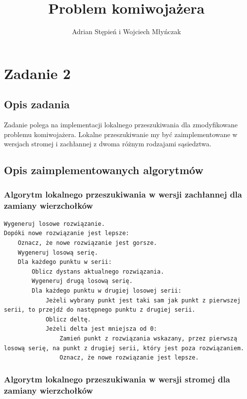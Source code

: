 \documentclass[a4paper]{article}
\title{Problem komiwojażera}
\author{Adrian Stępień i Wojciech Młyńczak}
\begin{document}
\maketitle

\section{Zadanie 2}

\subsection{Opis zadania}

Zadanie polega na implementacji lokalnego przeszukiwania dla zmodyfikowane problemu komiwojażera. Lokalne przeszukiwanie my być zaimplementowane w wersjach stromej i zachłannej z dwoma różnym rodzajami sąsiedztwa.

\subsection{Opis zaimplementowanych algorytmów}

\subsubsection{Algorytm lokalnego przeszukiwania w wersji zachłannej dla zamiany wierzchołków}

\begin{lstlisting}
Wygeneruj losowe rozwiązanie.
Dopóki nowe rozwiązanie jest lepsze:
    Oznacz, że nowe rozwiązanie jest gorsze.
    Wygeneruj losową serię.
    Dla każdego punktu w serii:
        Oblicz dystans aktualnego rozwiązania.
        Wygeneruj drugą losową serię.
        Dla każdego punktu w drugiej losowej serii:
            Jeżeli wybrany punkt jest taki sam jak punkt z pierwszej serii, to przejdź do następnego punktu z drugiej serii.
            Oblicz deltę.
            Jeżeli delta jest mniejsza od 0:
                Zamień punkt z rozwiązania wskazany, przez pierwszą losową serię, na punkt z drugiej serii, który jest poza rozwiązaniem.
                Oznacz, że nowe rozwiązanie jest lepsze.
\end{lstlisting}

\subsubsection{Algorytm lokalnego przeszukiwania w wersji stromej dla zamiany wierzchołków}
\end{document}
